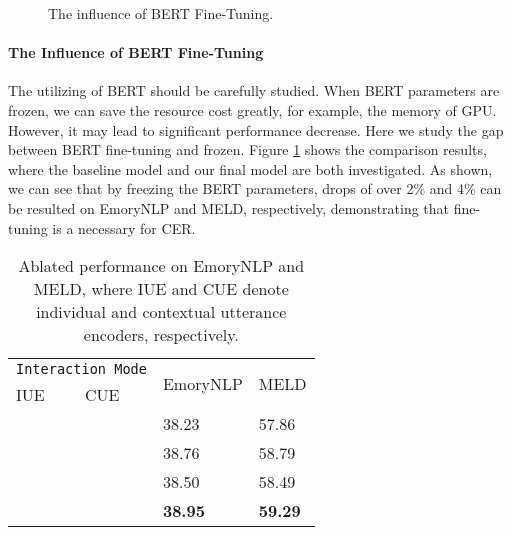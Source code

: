 \documentclass{article}
\begin{document}
\begin{CJK}{UTF8}{gbsn}
\begin{figure}[t]
\begin{center}
\hspace{-1.4cm}
\caption{The influence of BERT Fine-Tuning.}\label{figure_finetune}
\end{center}
\end{figure}

\paragraph{The Influence of BERT Fine-Tuning}
The utilizing of BERT should be carefully studied.
When BERT parameters are frozen, we can save the resource cost greatly, 
for example, the memory of GPU.
However, it may lead to significant performance decrease.
Here we study the gap between BERT fine-tuning and frozen.
Figure \ref{figure_finetune} shows the comparison results,
where the baseline model and our final model are both investigated.
As shown, we can see that by freezing the BERT parameters,
drops of over 2\% and 4\% can be resulted on EmoryNLP and MELD, respectively,
demonstrating that fine-tuning is a necessary for CER.




\begin{table}[t]
  \centering
  \begin{tabular}{p{1.6cm}<{\centering}|p{1.6cm}<{\centering}|p{1.6cm}<{\centering}|p{1.6cm}<{\centering}}
  \toprule[1pt]
  \multicolumn{2}{c|}{ \texttt{Interaction Mode}} & \multirow{2}{*}{EmoryNLP}  & \multirow{2}{*}{MELD} \\
  \cline{1-2}
  IUE & CUE  &  &  \\ \midrule[0.5pt]
   &  & 38.23 & 57.86 \\
   &  & 38.76 & 58.79 \\
   &  & 38.50 & 58.49 \\
   &  & \textbf{38.95} & \textbf{59.29} \\
  \bottomrule[1pt]
  \end{tabular}
  \caption{Ablated performance on EmoryNLP and MELD, where IUE and CUE denote individual and contextual utterance encoders, respectively.}
  \label{table_ablation}
\end{table}


\end{CJK}
\end{document}
